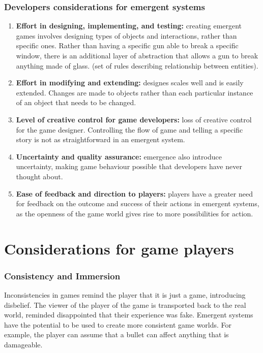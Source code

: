   \subsubsection*{Developers considerations for emergent systems}
    \begin{enumerate}
      \item {\bf Effort in designing, implementing, and testing:} creating emergent games involves designing types of objects and interactions, rather than specific ones. Rather than having a specific gun able to break a specific window, there is an additional layer of abstraction that allows a gun to break anything made of glass. (set of rules describing relationship between entities).
      \item {\bf Effort in modifying and extending:} designes scales well and is easily extended. Changes are made to objects rather than each particular instance of an object that needs to be changed. 
      \item {\bf Level of creative control for game developers:} loss of creative control for the game designer. Controlling the flow of game and telling a specific story is not as straightforward in an emergent system. 
      \item {\bf Uncertainty and quality assurance:} emergence also introduce uncertainty, making game behaviour possible that developers have never thought about.
      \item {\bf Ease of feedback and direction to players:} players have a greater need for feedback on the outcome and success of their actions in emergent systems, as the openness of the game world gives rise to more possibilities for action. 
    \end{enumerate}

\section*{Considerations for game players}
  
  \subsubsection*{Consistency and Immersion}

    Inconsistencies in games remind the player that it is just a game, introducing disbelief. The viewer of the player of the game is transported back to the real world, reminded disappointed that their experience was fake. Emergent systems have the potential to be used to create more consistent game worlds. For example, the player can assume that a bullet can affect anything that is damageable.

